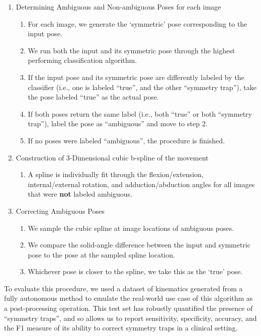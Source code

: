 {\begin{enumerate}
	\item Determining Ambiguous and Non-ambiguous Poses for each image
	      \begin{enumerate}
		      \item For each image, we generate the `symmetric' pose corresponding to the input pose.
		      \item We run both the input and its symmetric pose through the highest performing classification algorithm.
		      \item If the input pose and its symmetric pose are differently labeled by the classifier (i.e., one is labeled ``true'', and the other ``symmetry trap''), take the pose labeled ``true'' as the actual pose.
		      \item If both poses return the same label (i.e., both ``true'' or both ``symmetry trap''), label the pose as “ambiguous” and move to step 2.
		      \item If no poses were labeled “ambiguous”, the procedure is finished.
	      \end{enumerate}
	\item Construction of 3-Dimensional cubic b-spline of the movement
	      \begin{enumerate}
		      \item A spline is individually fit through the flexion/extension, internal/external rotation, and adduction/abduction angles for all images that were {\bf not} labeled ambiguous.
	      \end{enumerate}
	\item Correcting Ambiguous Poses
	      \begin{enumerate}
		      \item We sample the cubic spline at image locations of ambiguous poses.
		      \item We compare the solid-angle difference between the input and symmetric pose to the pose at the sampled spline location.
		      \item Whichever pose is closer to the spline, we take this as the `true' pose.
	      \end{enumerate}
\end{enumerate}

To evaluate this procedure, we used a dataset of kinematics generated from a fully autonomous method \cite{jensenJointTrackMachine2023} to emulate the real-world use case of this algorithm as a post-processing operation.
This test set has robustly quantified the presence of “symmetry traps”, and so allows us to report sensitivity, specificity, accuracy, and the F1 measure of its ability to correct symmetry traps in a clinical setting.


}
